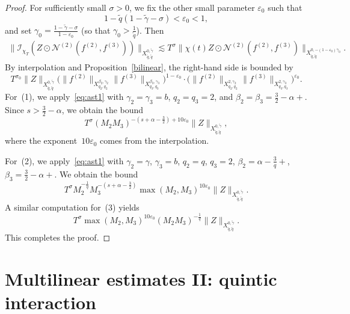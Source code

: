 \documentclass[11pt,reqno,english]{amsart}
\numberwithin{equation}{section}
\theoremstyle{plain}
\theoremstyle{definition}
\theoremstyle{remark}
\renewcommand{\epsilon}{\varepsilon}
\newcommand{\dotcirc}{\mathbin{\odot}}
\begin{document}
\begin{proof}
	For sufficiently small $\sigma>0$, we fix the other small parameter $\epsilon_0$ such that
	\[
	1-\widetilde{q}(1-\widetilde{\gamma}-\sigma)<\epsilon_0<1,
	\]
	and set $\gamma_0=\frac{1-\widetilde{\gamma}-\sigma}{1-\epsilon_0}$ (so that $\gamma_0>\frac{1}{\widetilde{q}}$). Then
	\begin{align*}
		\big\|\mathcal{I}_{\chi_T}(Z\dotcirc \mathcal{N}^{(2)}(f^{(2)},f^{(3)}))\big\|_{X_{\widetilde{q},\widetilde{q}}^{0,\widetilde{\gamma}}} \lesssim T^{\sigma}\big\|\chi(t)Z\dotcirc\mathcal{N}^{(2)}(f^{(2)},f^{(3)})\big\|_{X_{\widetilde{q},\widetilde{q}}^{0,-(1-\epsilon_0)\gamma_0}}.
	\end{align*}
	By interpolation and Proposition~\ref{bilinear}, the right-hand side is bounded by
	\begin{equation}
		\label{eq:ast1}
		T^{\sigma_0}\|Z\|_{X_{\widetilde{q},\widetilde{q}}^{0,\widetilde{\gamma}}} \big(\|f^{(2)}\|_{X_{q_2,q_2}^{\beta_2,\gamma_2}}\|f^{(3)}\|_{X_{q_3,q_3}^{\beta_3,\gamma_3}}\big)^{1-\epsilon_0}\cdot \big(\|f^{(2)}\|_{X_{q_2,q_2}^{2,\gamma_2}} \|f^{(3)}\|_{X_{q_3,q_3}^{2,\gamma_3}}\big)^{\epsilon_0}.
	\end{equation}
	For~(1), we apply~\eqref{eq:ast1} with $\gamma_2=\gamma_3=b$, $q_2=q_3=2$, and $\beta_2=\beta_3=\frac{3}{2}-\alpha+$. Since $s>\frac{3}{2}-\alpha$, we obtain the bound
	\[
	T^{\sigma} (M_2 M_3)^{-(s+\alpha-\frac{3}{2})+10\epsilon_0}
	\|Z\|_{X_{\widetilde{q},\widetilde{q}}^{0,\widetilde{\gamma}}},
	\]
	where the exponent~$10\epsilon_0$ comes from the interpolation.
	
	For~(2), we apply~\eqref{eq:ast1} with $\gamma_2=\gamma$, $\gamma_3=b$, $q_2=q$, $q_3=2$, $\beta_2=\alpha-\frac{3}{q}+$, $\beta_3=\frac{3}{2}-\alpha+$. We obtain the bound
	\[
	T^{\sigma}M_2^{-\frac{1}{q}}M_3^{-(s+\alpha-\frac{3}{2})}\max(M_2,M_3)^{10\epsilon_0}\|Z\|_{X_{\widetilde{q},\widetilde{q}}^{0,\widetilde{\gamma}}}.
	\]
	A similar computation for~(3) yields
	\[
	T^{\sigma}\max(M_2,M_3)^{10\epsilon_0}(M_2 M_3)^{-\frac{1}{q}}\|Z\|_{X_{\widetilde{q},\widetilde{q}}^{0,\widetilde{\gamma}}}.
	\]
	This completes the proof.
\end{proof}

	
	\section{Multilinear estimates II: quintic interaction}\label{sec:quintilinear}
\end{document}

